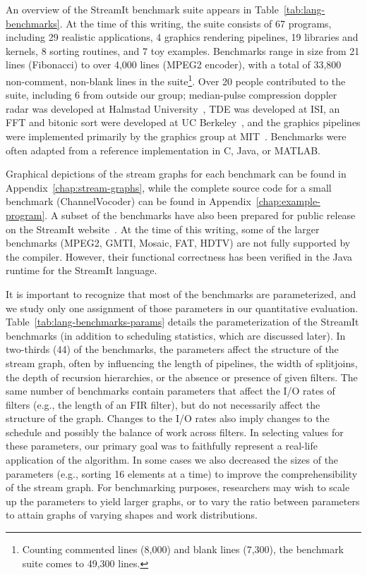 An overview of the StreamIt benchmark suite appears in
Table~\ref{tab:lang-benchmarks}.  At the time of this writing, the
suite consists of 67 programs, including 29 realistic applications, 4
graphics rendering pipelines, 19 libraries and kernels, 8 sorting
routines, and 7 toy examples.  Benchmarks range in size from 21 lines
(Fibonacci) to over 4,000 lines (MPEG2 encoder), with a total of
33,800 non-comment, non-blank lines in the suite\footnote{Counting
commented lines (8,000) and blank lines (7,300), the benchmark suite
comes to 49,300 lines.}.  Over 20 people contributed to the suite,
including 6 from outside our group; median-pulse compression doppler
radar was developed at Halmstad University~\cite{ola-techrep}, TDE was
developed at ISI, an FFT and bitonic sort were developed at UC
Berkeley~\cite{mani-permutations}, and the graphics pipelines were
implemented primarily by the graphics group at
MIT~\cite{chen-graphics05}.  Benchmarks were often adapted from a
reference implementation in C, Java, or MATLAB.

Graphical depictions of the stream graphs for each benchmark can be
found in Appendix~\ref{chap:stream-graphs}, while the complete source
code for a small benchmark (ChannelVocoder) can be found in
Appendix~\ref{chap:example-program}.  A subset of the benchmarks have
also been prepared for public release on the StreamIt
website~\cite{streamitweb}.  At the time of this writing, some of the
larger benchmarks (MPEG2, GMTI, Mosaic, FAT, HDTV) are not fully
supported by the compiler.  However, their functional correctness has
been verified in the Java runtime for the StreamIt language.

It is important to recognize that most of the benchmarks are
parameterized, and we study only one assignment of those parameters in
our quantitative evaluation.  Table~\ref{tab:lang-benchmarks-params}
details the parameterization of the StreamIt benchmarks (in addition
to scheduling statistics, which are discussed later).  In two-thirds
(44) of the benchmarks, the parameters affect the structure of the
stream graph, often by influencing the length of pipelines, the width
of splitjoins, the depth of recursion hierarchies, or the absence or
presence of given filters.  The same number of benchmarks contain
parameters that affect the I/O rates of filters (e.g., the length of
an FIR filter), but do not necessarily affect the structure of the
graph.  Changes to the I/O rates also imply changes to the schedule
and possibly the balance of work across filters.  In selecting values
for these parameters, our primary goal was to faithfully represent a
real-life application of the algorithm.  In some cases we also
decreased the sizes of the parameters (e.g., sorting 16 elements at a
time) to improve the comprehensibility of the stream graph.  For
benchmarking purposes, researchers may wish to scale up the parameters
to yield larger graphs, or to vary the ratio between parameters to
attain graphs of varying shapes and work distributions.

